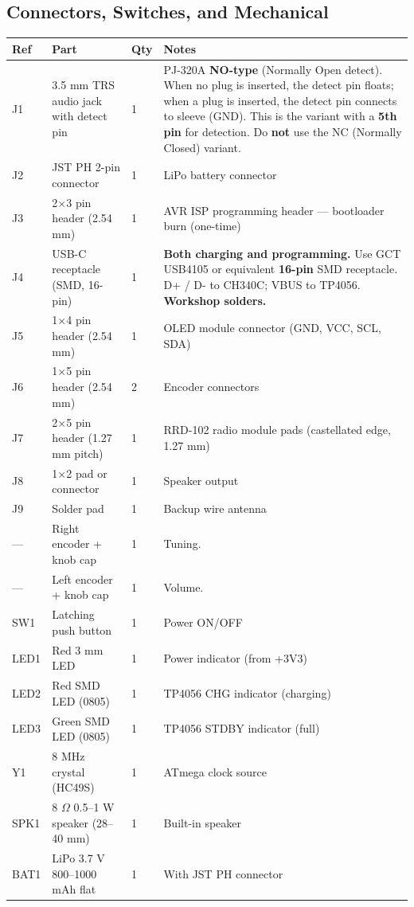\documentclass[a4paper,11pt]{article}
\renewcommand*{\,}{ }%
\begin{document}
\subsection{Connectors, Switches, and Mechanical}

\begin{longtable}{@{}p{1cm}p{4.5cm}p{1cm}p{6cm}@{}}
\toprule
\textbf{Ref} & \textbf{Part} & \textbf{Qty} & \textbf{Notes} \\
\midrule
\endhead
J1 & 3.5\,mm TRS audio jack with detect pin & 1 & PJ-320A \textbf{NO-type} (Normally Open detect). When no plug is inserted, the detect pin floats; when a plug is inserted, the detect pin connects to sleeve (GND). This is the variant with a \textbf{5th pin} for detection. Do \textbf{not} use the NC (Normally Closed) variant. \\
J2 & JST PH 2-pin connector & 1 & LiPo battery connector \\
J3 & 2$\times$3 pin header (2.54\,mm) & 1 & AVR ISP programming header --- bootloader burn (one-time) \\
J4 & USB-C receptacle (SMD, 16-pin) & 1 & \textbf{Both charging and programming.} Use GCT USB4105 or equivalent \textbf{16-pin} SMD receptacle. D+ / D- to CH340C; VBUS to TP4056. \textbf{Workshop solders.} \\
J5 & 1$\times$4 pin header (2.54\,mm) & 1 & OLED module connector (GND, VCC, SCL, SDA) \\
J6 & 1$\times$5 pin header (2.54\,mm) & 2 & Encoder connectors \\
J7 & 2$\times$5 pin header (1.27\,mm pitch) & 1 & RRD-102 radio module pads (castellated edge, 1.27\,mm) \\
J8 & 1$\times$2 pad or connector & 1 & Speaker output \\
J9 & Solder pad & 1 & Backup wire antenna \\
--- & Right encoder + knob cap & 1 & Tuning. \\
--- & Left encoder + knob cap & 1 & Volume. \\
SW1 & Latching push button & 1 & Power ON/OFF \\
LED1 & Red 3\,mm LED & 1 & Power indicator (from +3V3) \\
LED2 & Red SMD LED (0805) & 1 & TP4056 CHG indicator (charging) \\
LED3 & Green SMD LED (0805) & 1 & TP4056 STDBY indicator (full) \\
Y1 & 8\,MHz crystal (HC49S) & 1 & ATmega clock source \\
SPK1 & 8\,$\Omega$ 0.5--1\,W speaker (28--40\,mm) & 1 & Built-in speaker \\
BAT1 & LiPo 3.7\,V 800--1000\,mAh flat & 1 & With JST PH connector \\
\bottomrule
\end{longtable}
\end{document}

